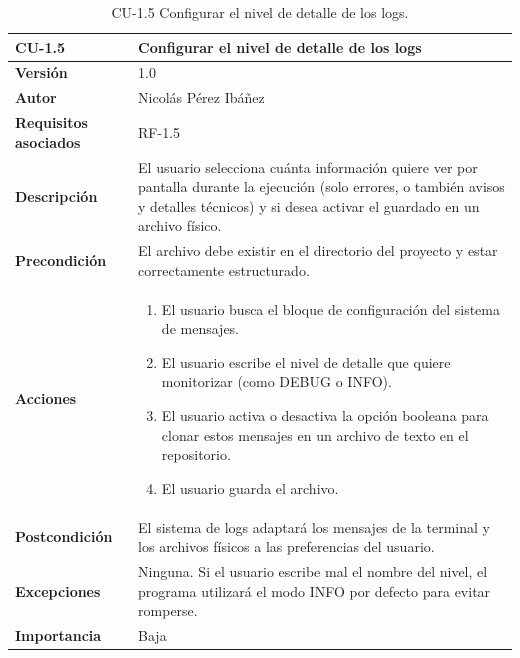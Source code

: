\begin{table}[p]
	\centering
	\begin{tabularx}{\linewidth}{ p{} p{} }
		\toprule
		\textbf{CU-1.5}    & \textbf{Configurar el nivel de detalle de los logs}\\
		\toprule
		\textbf{Versión}              & 1.0    \\
		\textbf{Autor}                & Nicolás Pérez Ibáñez \\
		\textbf{Requisitos asociados} & RF-1.5 \\
		\textbf{Descripción}          & El usuario selecciona cuánta información quiere ver por pantalla durante la ejecución (solo errores, o también avisos y detalles técnicos) y si desea activar el guardado en un archivo físico. \\
		\textbf{Precondición}         & El archivo \ruta{config/config.json} debe existir en el directorio del proyecto y estar correctamente estructurado. \\
		\textbf{Acciones}             &
		\begin{enumerate}
			\def\labelenumi{\arabic{enumi}.}
			\tightlist
			\item El usuario busca el bloque de configuración del sistema de mensajes.
			\item El usuario escribe el nivel de detalle que quiere monitorizar (como DEBUG o INFO).
			\item El usuario activa o desactiva la opción booleana para clonar estos mensajes en un archivo de texto en el repositorio.
			\item El usuario guarda el archivo.
		\end{enumerate}\\
		\textbf{Postcondición}        & El sistema de logs adaptará los mensajes de la terminal y los archivos físicos a las preferencias del usuario. \\
		\textbf{Excepciones}          & Ninguna. Si el usuario escribe mal el nombre del nivel, el programa utilizará el modo INFO por defecto para evitar romperse. \\
		\textbf{Importancia}          & Baja \\
		\bottomrule
	\end{tabularx}
	\caption{CU-1.5 Configurar el nivel de detalle de los logs.}
\end{table}



